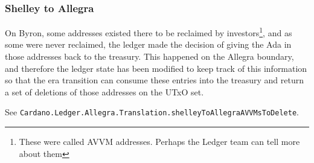 \documentclass[11pt,a4paper]{article}
\theoremstyle{definition}
\begin{document}
\subsubsection{Shelley to Allegra}

On Byron, some addresses existed there to be reclaimed by
investors\footnote{These were called AVVM addresses. Perhaps the Ledger team can
  tell more about them}, and as some were never reclaimed, the ledger made the
decision of giving the Ada in those addresses back to the treasury. This
happened on the Allegra boundary, and therefore the ledger state has been
modified to keep track of this information so that the era transition can
consume these entries into the treasury and return a set of deletions of those
addresses on the UTxO set.

See \texttt{Cardano.Ledger.Allegra.Translation.shelleyToAllegraAVVMsToDelete}.



\end{document}
